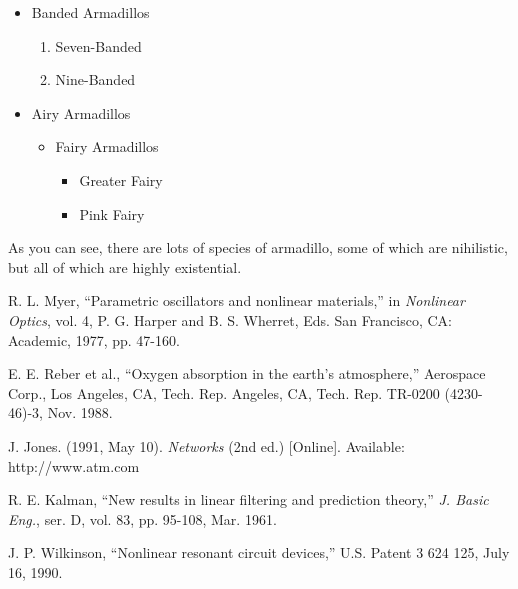 \documentclass[a4paper, 10pt]{IEEEtran}
\begin{document}
\begin{itemize} %
\item Banded Armadillos
\begin{enumerate} %
	\item Seven-Banded
	\item Nine-Banded
\end{enumerate}
\item Airy Armadillos
\begin{itemize}
	\item Fairy Armadillos
	\begin{itemize}
		\item Greater Fairy
		\item Pink Fairy
	\end{itemize}
\end{itemize}
\end{itemize}

As you can see, there are lots of species of armadillo, some of which are nihilistic, but all of which are highly existential.

\begin{thebibliography}{99}
\label{references}

	R. L. Myer, ``Parametric oscillators and nonlinear materials,'' in \textit{Nonlinear Optics}, vol. 4, P. G. Harper and B. S. Wherret, Eds. San Francisco, CA: Academic, 1977, pp. 47-160.

	E. E. Reber et al., ``Oxygen absorption in the earth’s atmosphere,'' Aerospace Corp., Los Angeles, CA, Tech. Rep. Angeles, CA, Tech. Rep. TR-0200 (4230-46)-3, Nov. 1988.

	J. Jones. (1991, May 10). \textit{Networks} (2nd ed.) [Online]. Available: http://www.atm.com

	 R. E. Kalman, ``New results in linear filtering and prediction theory,'' \textit{J. Basic Eng.}, ser. D, vol. 83, pp. 95-108, Mar. 1961.

	J. P. Wilkinson, “Nonlinear resonant circuit devices,” U.S. Patent 3 624 125, July 16, 1990.


\end{thebibliography}


\appendix
\label{appendix}
\end{document}
